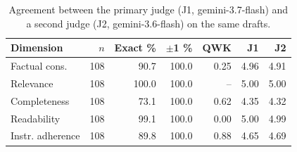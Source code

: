 \begin{table}[t]
\centering
\caption{Agreement between the primary judge (J1, gemini-3.7-flash) and a second judge (J2, gemini-3.6-flash) on the same drafts.}
\label{tab:judge}
\footnotesize
\setlength{\tabcolsep}{3.5pt}
\begin{tabular}{lrrrrrr}
\toprule
Dimension & $n$ & Exact \% & $\pm$1 \% & QWK & J1 & J2 \\
\midrule
Factual cons. & 108 & 90.7 & 100.0 & 0.25 & 4.96 & 4.91 \\
Relevance & 108 & 100.0 & 100.0 & -- & 5.00 & 5.00 \\
Completeness & 108 & 73.1 & 100.0 & 0.62 & 4.35 & 4.32 \\
Readability & 108 & 99.1 & 100.0 & 0.00 & 5.00 & 4.99 \\
Instr. adherence & 108 & 89.8 & 100.0 & 0.88 & 4.65 & 4.69 \\
\bottomrule
\end{tabular}
\end{table}
